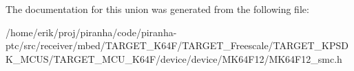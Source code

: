 The documentation for this union was generated from the following file\+:\begin{DoxyCompactItemize}
\item 
/home/erik/proj/piranha/code/piranha-\/ptc/src/receiver/mbed/\+T\+A\+R\+G\+E\+T\+\_\+\+K64\+F/\+T\+A\+R\+G\+E\+T\+\_\+\+Freescale/\+T\+A\+R\+G\+E\+T\+\_\+\+K\+P\+S\+D\+K\+\_\+\+M\+C\+U\+S/\+T\+A\+R\+G\+E\+T\+\_\+\+M\+C\+U\+\_\+\+K64\+F/device/device/\+M\+K64\+F12/M\+K64\+F12\+\_\+smc.\+h\end{DoxyCompactItemize}
